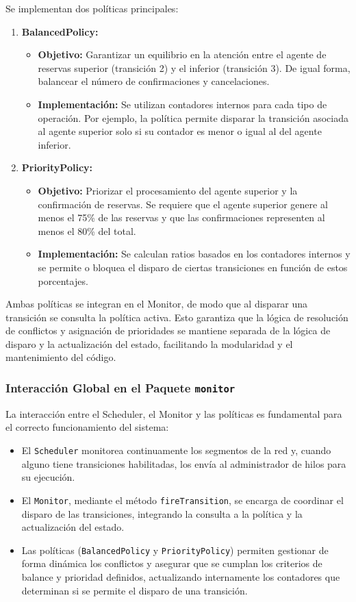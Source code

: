 \documentclass[12pt]{article}
\begin{document}
Se implementan dos políticas principales:
\begin{enumerate}
    \item \textbf{BalancedPolicy:}  
    \begin{itemize}
        \item \textbf{Objetivo:} Garantizar un equilibrio en la atención entre el agente de reservas superior (transición 2) y el inferior (transición 3). De igual forma, balancear el número de confirmaciones y cancelaciones.
        \item \textbf{Implementación:} Se utilizan contadores internos para cada tipo de operación. Por ejemplo, la política permite disparar la transición asociada al agente superior solo si su contador es menor o igual al del agente inferior.
    \end{itemize}
    \item \textbf{PriorityPolicy:}  
    \begin{itemize}
        \item \textbf{Objetivo:} Priorizar el procesamiento del agente superior y la confirmación de reservas. Se requiere que el agente superior genere al menos el 75\% de las reservas y que las confirmaciones representen al menos el 80\% del total.
        \item \textbf{Implementación:} Se calculan ratios basados en los contadores internos y se permite o bloquea el disparo de ciertas transiciones en función de estos porcentajes.
    \end{itemize}
\end{enumerate}

Ambas políticas se integran en el Monitor, de modo que al disparar una transición se consulta la política activa. Esto garantiza que la lógica de resolución de conflictos y asignación de prioridades se mantiene separada de la lógica de disparo y la actualización del estado, facilitando la modularidad y el mantenimiento del código.

\subsubsection{Interacción Global en el Paquete \texttt{monitor}}

La interacción entre el Scheduler, el Monitor y las políticas es fundamental para el correcto funcionamiento del sistema:
\begin{itemize}
    \item El \texttt{Scheduler} monitorea continuamente los segmentos de la red y, cuando alguno tiene transiciones habilitadas, los envía al administrador de hilos para su ejecución.
    \item El \texttt{Monitor}, mediante el método \texttt{fireTransition}, se encarga de coordinar el disparo de las transiciones, integrando la consulta a la política y la actualización del estado.
    \item Las políticas (\texttt{BalancedPolicy} y \texttt{PriorityPolicy}) permiten gestionar de forma dinámica los conflictos y asegurar que se cumplan los criterios de balance y prioridad definidos, actualizando internamente los contadores que determinan si se permite el disparo de una transición.
\end{itemize}
\end{document}
